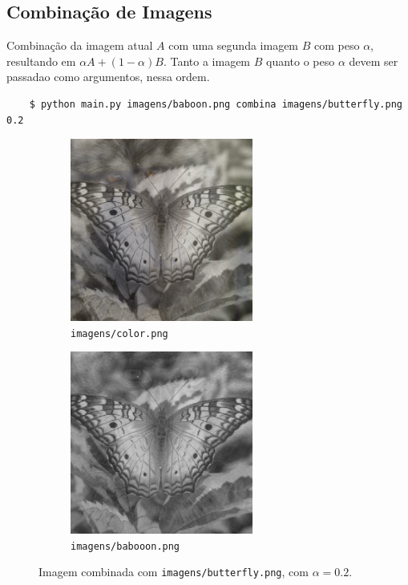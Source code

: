 \subsection{Combinação de Imagens}

Combinação da imagem atual $A$ com uma segunda imagem $B$ com peso $\alpha$, resultando em $\alpha A + (1 - \alpha) B$. Tanto a imagem $B$ quanto o peso $\alpha$ devem ser passadao como argumentos, nessa ordem.

\begin{verbatim}
    $ python main.py imagens/baboon.png combina imagens/butterfly.png 0.2
\end{verbatim}

\begin{figure}[H]
    \centering
    \begin{subfigure}{0.45\textwidth}
        \centering
        \includegraphics[width=6cm]{resultados/colormerg.png}
        \caption{\texttt{imagens/color.png}}
    \end{subfigure}%
    \begin{subfigure}{0.45\textwidth}
        \centering
        \includegraphics[width=6cm]{resultados/baboonmerg.png}
        \caption{\texttt{imagens/babooon.png}}
    \end{subfigure}

    \caption{Imagem combinada com \texttt{imagens/butterfly.png}, com $\alpha = 0.2$.}
\end{figure}

